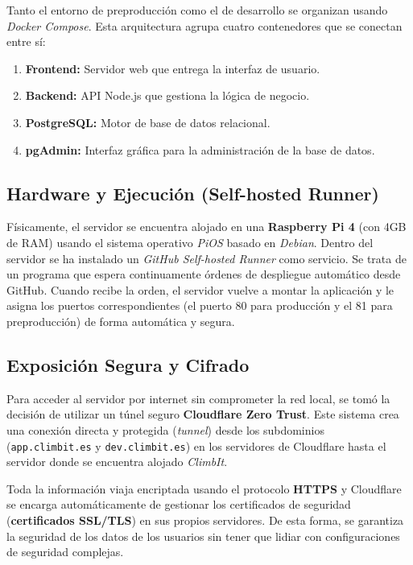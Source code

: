 Tanto el entorno de preproducción como el de desarrollo se organizan usando \textit{Docker Compose}. Esta arquitectura agrupa cuatro contenedores que se conectan entre sí:

\begin{enumerate}
    \item \textbf{Frontend:} Servidor web que entrega la interfaz de usuario.
    \item \textbf{Backend:} API Node.js que gestiona la lógica de negocio.
    \item \textbf{PostgreSQL:} Motor de base de datos relacional.
    \item \textbf{pgAdmin:} Interfaz gráfica para la administración de la base de datos.
\end{enumerate}

\subsection{Hardware y Ejecución (Self-hosted Runner)}

Físicamente, el servidor se encuentra alojado en una \textbf{Raspberry Pi 4} (con 4GB de RAM) usando el sistema operativo \textit{PiOS} basado en \textit{Debian}. Dentro del servidor se ha instalado un \textit{GitHub Self-hosted Runner} como servicio. Se trata de un programa que espera continuamente órdenes de despliegue automático desde GitHub. Cuando recibe la orden, el servidor vuelve a montar la aplicación y le asigna los puertos correspondientes (el puerto 80 para producción y el 81 para preproducción) de forma automática y segura.

\subsection{Exposición Segura y Cifrado}

Para acceder al servidor por internet sin comprometer la red local, se tomó la decisión de utilizar un túnel seguro \textbf{Cloudflare Zero Trust}. Este sistema crea una conexión directa y protegida (\textit{tunnel}) desde los subdominios (\texttt{app.climbit.es} y \texttt{dev.climbit.es}) en los servidores de Cloudflare hasta el servidor donde se encuentra alojado \textit{ClimbIt}.

Toda la información viaja encriptada usando el protocolo \textbf{HTTPS} y Cloudflare se encarga automáticamente de gestionar los certificados de seguridad (\textbf{certificados SSL/TLS}) en sus propios servidores. De esta forma, se garantiza la seguridad de los datos de los usuarios sin tener que lidiar con configuraciones de seguridad complejas.

